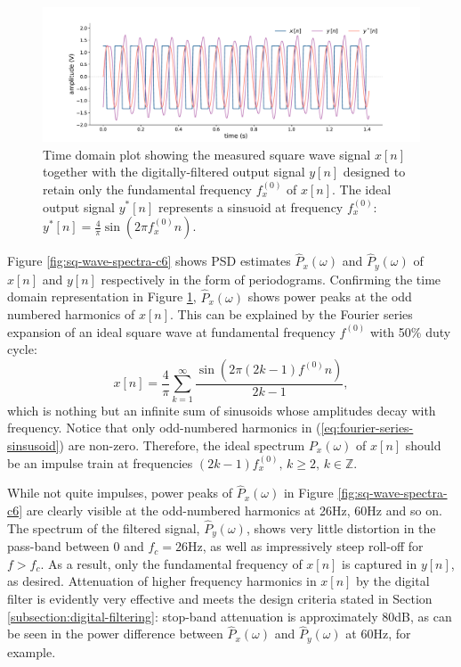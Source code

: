 \begin{figure}[h]
    \centering
    \includegraphics[width=\textwidth]{sq_wave_filtering_time}
    \caption[Time domain plot showing the measured square wave signal together with the digitally-filtered output signal.]{Time domain plot showing the measured square wave signal $x[n]$ together with the digitally-filtered output signal $y[n]$ designed to retain only the fundamental frequency $f_x^{(0)}$ of $x[n]$. The ideal output signal $y^*[n]$ represents a sinsuoid at frequency $f_x^{(0)}$: $y^*[n] = \frac{4}{\pi}\sin(2\pi f_x^{(0)}n)$.}
    \label{fig:sq-wave-time-c6}
\end{figure}

Figure \ref{fig:sq-wave-spectra-c6} shows PSD estimates $\hat{P}_x(\omega)$ and $\hat{P}_y(\omega)$ of $x[n]$ and $y[n]$ respectively in the form of periodograms. Confirming the time domain representation in Figure \ref{fig:sq-wave-time-c6}, $\hat{P}_x(\omega)$ shows power peaks at the odd numbered harmonics of $x[n]$. This can be explained by the Fourier series expansion of an ideal square wave at fundamental frequency $f^{(0)}$ with 50\% duty cycle:
\begin{equation}
    x[n]=\frac{4}{\pi} \sum_{k=1}^{\infty} \frac{\sin (2 \pi(2 k-1) f^{(0)} n)}{2 k-1},
    \label{eq:fourier-series-sinsusoid}
\end{equation}
which is nothing but an infinite sum of sinusoids whose amplitudes decay with frequency. Notice that only odd-numbered harmonics in (\ref{eq:fourier-series-sinsusoid}) are non-zero. Therefore, the ideal spectrum $P_x(\omega)$ of $x[n]$ should be an impulse train at frequencies $(2k-1)f_x^{(0)}, \, k\geq2, \, k\in\mathbb{Z}$. 

While not quite impulses, power peaks of $\hat{P}_x(\omega)$ in Figure \ref{fig:sq-wave-spectra-c6} are clearly visible at the odd-numbered harmonics at 26Hz, 60Hz and so on. The spectrum of the filtered signal, $\hat{P}_y(\omega)$, shows very little distortion in the pass-band between 0 and $f_c=26$Hz, as well as impressively steep roll-off for $f>f_c$. As a result, only the fundamental frequency of $x[n]$ is captured in $y[n]$, as desired. Attenuation of higher frequency harmonics in $x[n]$ by the digital filter is evidently very effective and meets the design criteria stated in Section \ref{subsection:digital-filtering}: stop-band attenuation is approximately 80dB, as can be seen in the power difference between $\hat{P}_x(\omega)$ and $\hat{P}_y(\omega)$ at 60Hz, for example.

